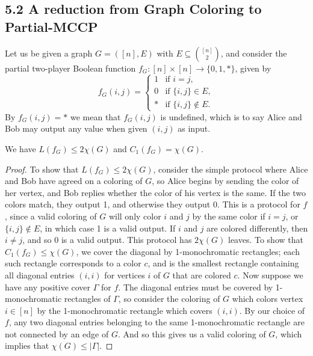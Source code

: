 \subsection*{5.2 A reduction from Graph Coloring to Partial-MCCP}
Let us be given a graph $G=([n],E)$ with $E\subseteq\binom{[n]}2$, and consider the partial two-player Boolean function $f_G:[n]\times[n]\to\{0,1,*\}$, given by
\[f_G(i,j)=\begin{cases}1&\text{if }i=j,\\0&\text{if }\{i,j\}\in E,\\ *&\text{if }\{i,j\}\notin E.\end{cases}\]
By $f_G(i,j)=*$ we mean that $f_G(i,j)$ is undefined, which is to say Alice and Bob may output any value when given $(i,j)$ as input.
\setcounter{nttheorem}{31}
\begin{nttheorem}
We have $L(f_G)\leq2\chi(G)$ and $C_1(f_G)=\chi(G)$.
\end{nttheorem}
\begin{proof}
To show that $L(f_G)\leq2\chi(G)$, consider the simple protocol where Alice and Bob have agreed on a coloring of $G$, so Alice begins by sending the color of her vertex, and Bob replies whether the color of his vertex is the same. If the two colors match, they output 1, and otherwise they output 0.
This is a protocol for $f$, since a valid coloring of $G$ will only color $i$ and $j$ by the same color if $i=j$, or $\{i,j\}\notin E$, in which case 1 is a valid output. If $i$ and $j$ are colored differently, then $i\ne j$, and so 0 is a valid output. This protocol has $2\chi(G)$ leaves.
To show that $C_1(f_G)\leq\chi(G)$, we cover the diagonal by 1-monochromatic rectangles; each such rectangle corresponds to a color $c$, and is the smallest rectangle containing all diagonal entries $(i,i)$ for vertices $i$ of $G$ that are colored $c$.
Now suppose we have any positive cover $\Gamma$ for $f$. The diagonal entries must be covered by 1-monochromatic rectangles of $\Gamma$, so consider the coloring of $G$ which colors vertex $i\in[n]$ by the 1-monochromatic rectangle which covers $(i,i)$. By our choice of $f$, any two diagonal entries belonging to the same 1-monochromatic rectangle are not connected by an edge of $G$. And so this gives us a valid coloring of $G$, which implies that $\chi(G)\leq|\Gamma|$.
\end{proof}
